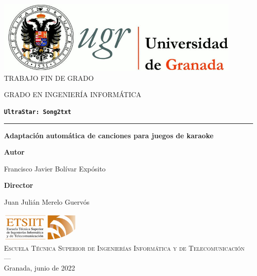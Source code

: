 \begin{titlepage}
\newlength{\centeroffset}
\setlength{\centeroffset}{-0.5\oddsidemargin}
\addtolength{\centeroffset}{0.5\evensidemargin}
\thispagestyle{empty}

\noindent\hspace*{\centeroffset}\begin{minipage}{\textwidth}

\centering
\includegraphics[width=0.9\textwidth]{logos/logo_ugr.jpg}\\[1.4cm]

\textsc{ \Large TRABAJO FIN DE GRADO}
\vspace{0.2cm}

\textsc{ GRADO EN INGENIERÍA INFORMÁTICA}
\vspace{1cm}

{\texttt{\normalfont\Huge\bfseries UltraStar: Song2txt \\}}
\noindent\rule[-1ex]{\textwidth}{3pt}

\vspace{3.5ex}
{\large\bfseries Adaptación automática de canciones para juegos de karaoke}
\end{minipage}

\vspace{2.5cm}
\noindent\hspace*{\centeroffset}
\begin{minipage}{\textwidth}
\centering

\textbf{Autor} 

{Francisco Javier Bolívar Expósito}
\vspace{2.5ex}

\textbf{Director} 

{Juan Julián Merelo Guervós}
\vspace{2cm}

\includegraphics[width=0.3\textwidth]{logos/etsiit_logo.png}\\[0.1cm]
\textsc{Escuela Técnica Superior de Ingenierías Informática y de Telecomunicación}\\
\textsc{---}\\
Granada, junio de 2022
\end{minipage}
\end{titlepage}
